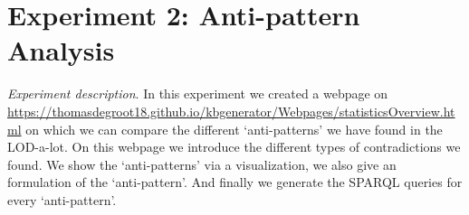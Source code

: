 \documentclass[11pt,letterpaper ,oneside ]{book}
\begin{document}
\section{Experiment 2: Anti-pattern Analysis} %
\textit{Experiment description}. In this experiment we created a webpage on\\ \url{https://thomasdegroot18.github.io/kbgenerator/Webpages/statisticsOverview.html} on which we can compare the different `anti-patterns' we have found in the LOD-a-lot. On this webpage we introduce the different types of contradictions we found. We show the `anti-patterns' via a visualization, we also give an formulation of the `anti-pattern'. And finally we generate the SPARQL queries for every `anti-pattern'.  

\begin{figure}[!t]
\end{figure}
\end{document}
